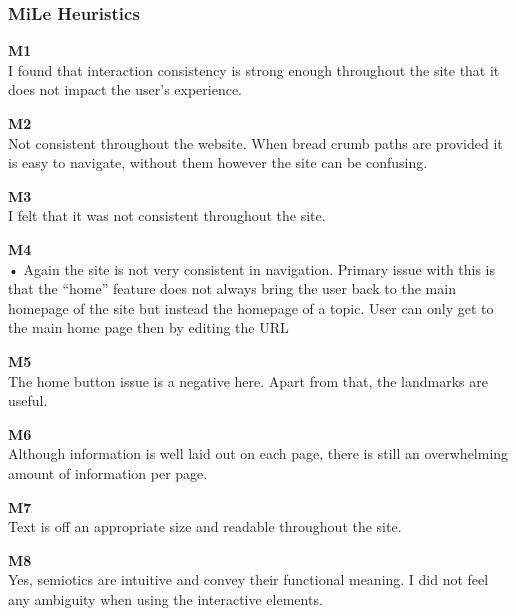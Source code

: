 \subsubsection{MiLe Heuristics}
\begin{description}
    \item {\textbf{M1} \color{unicefGray}{Interaction consistency}}\\
    I found that interaction consistency is strong enough throughout the site that it does not impact the user’s experience. 
    \item {\textbf{M2} \color{unicefGray}{Group navigation}}\\
    Not consistent throughout the website. When bread crumb paths are provided it is easy to navigate, without them however the site can be confusing. 
    \item {\textbf{M3} \color{unicefGray}{Structural Navigation}}\\
    I felt that it was not consistent throughout the site. 
    \item {\textbf{M4} \color{unicefGray}{Semantic Navigation}}\\
    •	Again the site is not very consistent in navigation. Primary issue with this is that the “home” feature does not always bring the user back to the main homepage of the site but instead the homepage of a topic. User can only get to the main home page then by editing the URL
    \item {\textbf{M5} \color{unicefGray}{landmarks}}\\
    The home button issue is a negative here. Apart from that, the landmarks are useful.
    \item {\textbf{M6} \color{unicefGray}{Information overload}}\\
    Although information is well laid out on each page, there is still an overwhelming amount of information per page. 
    \item {\textbf{M7} \color{unicefGray}{Text layout}}\\
    Text is off an appropriate size and readable throughout the site.
    \item {\textbf{M8} \color{unicefGray}{Interaction placeholder semiotics}}\\
    Yes, semiotics are intuitive and convey their functional meaning. I did not feel any ambiguity when using the interactive elements.
    \begin{figure}[h]
        \centering

\end{figure}
\end{description}
